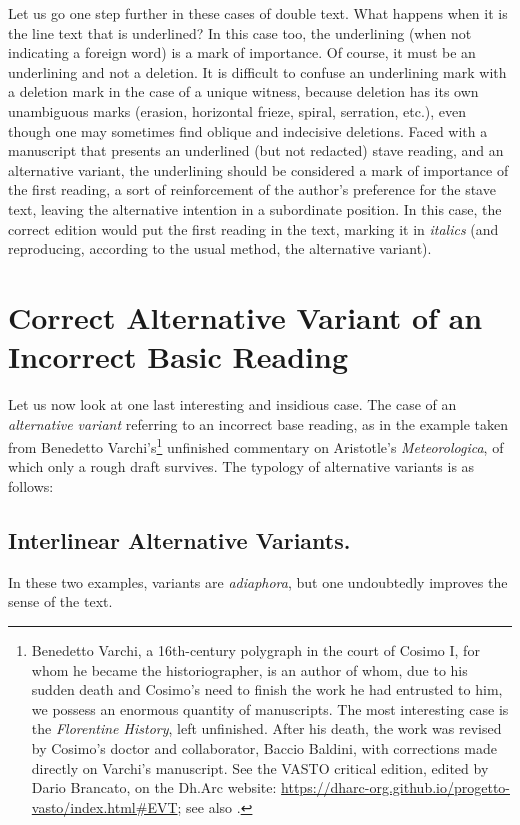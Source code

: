 \documentclass{article}
\begin{document}
Let us go one step further in these cases of double text. What happens
when it is the line text that is underlined? In this case too, the
underlining (when not indicating a foreign word) is a mark of
importance. Of course, it must be an underlining and not a deletion.
It is difficult to confuse an underlining mark with a deletion mark in
the case of a unique witness, because deletion has its own unambiguous
marks (erasion, horizontal frieze, spiral, serration, etc.), even though
one may sometimes find oblique and indecisive deletions. Faced with a
manuscript that presents an underlined (but not redacted) stave reading,
and an alternative variant, the underlining should be considered a mark
of importance of the first reading, a sort of reinforcement of the
author's preference for the stave text, leaving the alternative
intention in a subordinate position. In this case, the correct edition
would put the first reading in the text, marking it in \emph{italics}
(and reproducing, according to the usual method, the alternative
variant).

\section{Correct Alternative Variant of an Incorrect Basic Reading}

Let us now look at one last interesting and insidious case. The case of
an \emph{alternative variant} referring to an incorrect base reading, as
in the example taken from Benedetto Varchi's\footnote{Benedetto Varchi,
  a 16th-century polygraph in the court of Cosimo I, for whom he became
  the historiographer, is an author of whom, due to his sudden death and
  Cosimo's need to finish the work he had entrusted to him, we possess
  an enormous quantity of manuscripts. The most interesting case is the
  \emph{Florentine History}, left unfinished. After his death, the work
  was revised by Cosimo's doctor and collaborator, Baccio Baldini, with
  corrections made directly on Varchi's manuscript. See the VASTO
  critical edition, edited by Dario Brancato, on the Dh.Arc website:
  \url{https://dharc-org.github.io/progetto-vasto/index.html\#EVT}; see
  also \cite{brancato_vasto_2021}.}
unfinished commentary on Aristotle's \emph{Meteorologica}, of which only
a rough draft survives. The typology of alternative variants is as
follows:

\subsection{Interlinear Alternative Variants.} In these two examples,
variants are \emph{adiaphora}, but one undoubtedly improves the sense of
the text.
\end{document}
